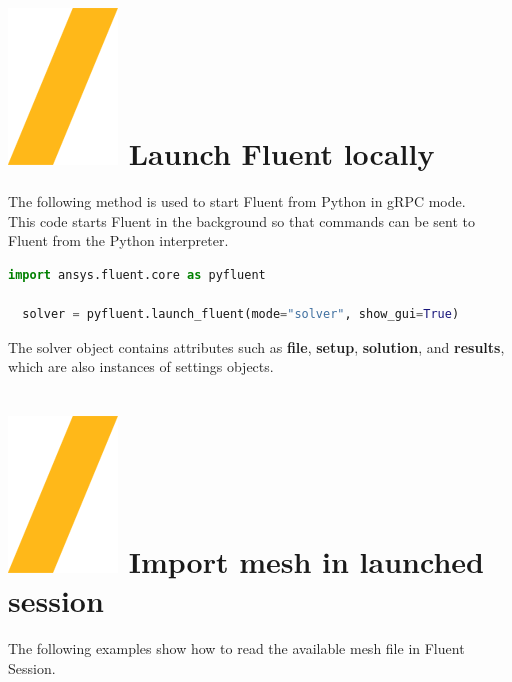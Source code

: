 \documentclass[9pt,landscape]{article}
\begin{document}
\begin{multicols}{3}
\setlength{\premulticols}{1pt}
\setlength{\postmulticols}{1pt}
\setlength{\multicolsep}{1pt}
\setlength{\columnsep}{2pt}

\vfill
\section{\includegraphics[height=\fontcharht\font`\S]{slash.png} Launch Fluent locally}
The following method is used to start Fluent from Python in gRPC mode.\\
This code starts Fluent in the background so that commands can be sent to Fluent from the Python interpreter.

\begin{lstlisting}[language=Python]
  import ansys.fluent.core as pyfluent

  solver = pyfluent.launch_fluent(mode="solver", show_gui=True)
\end{lstlisting}

The solver object contains attributes such as \textbf{file}, \textbf{setup}, \textbf{solution}, and \textbf{results}, 
which are also instances of settings objects. 

\section{\includegraphics[height=\fontcharht\font`\S]{slash.png} Import mesh in launched session}

The following examples show how to read the available mesh file in Fluent Session.


\end{multicols}
\end{document}
